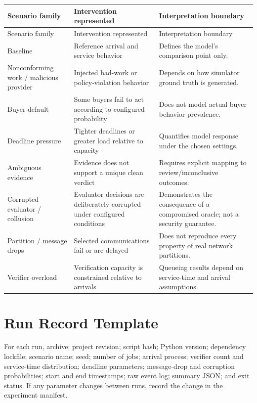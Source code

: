\documentclass[12pt,a4paper,oneside]{report}
\begin{document}
\begin{longtable}{>{\raggedright\arraybackslash}p{}>{\raggedright\arraybackslash}p{}>{\raggedright\arraybackslash}p{}}
\toprule
Scenario family & Intervention represented & Interpretation boundary \\
\midrule
\endfirsthead
\toprule Scenario family & Intervention represented & Interpretation boundary \\
\endhead
Baseline & Reference arrival and service behavior & Defines the model's comparison point only. \\
Nonconforming work / malicious provider & Injected bad-work or policy-violation behavior & Depends on how simulator ground truth is generated. \\
Buyer default & Some buyers fail to act according to configured probability & Does not model actual buyer behavior prevalence. \\
Deadline pressure & Tighter deadlines or greater load relative to capacity & Quantifies model response under the chosen settings. \\
Ambiguous evidence & Evidence does not support a unique clean verdict & Requires explicit mapping to review/inconclusive outcomes. \\
Corrupted evaluator / collusion & Evaluator decisions are deliberately corrupted under configured conditions & Demonstrates the consequence of a compromised oracle; not a security guarantee. \\
Partition / message drops & Selected communications fail or are delayed & Does not reproduce every property of real network partitions. \\
Verifier overload & Verification capacity is constrained relative to arrivals & Queueing results depend on service-time and arrival assumptions. \\
\bottomrule
\end{longtable}

\section{Run Record Template}
For each run, archive: project revision; script hash; Python version; dependency lockfile; scenario name; seed; number of jobs; arrival process; verifier count and service-time distribution; deadline parameters; message-drop and corruption probabilities; start and end timestamps; raw event log; summary JSON; and exit status. If any parameter changes between runs, record the change in the experiment manifest.
\end{document}
